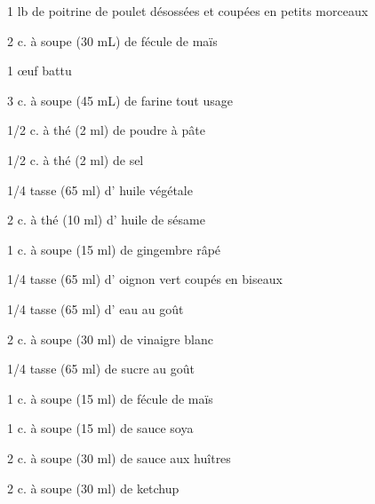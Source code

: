 


\totaltime{}


\begin{ingredients}
    \item 1 lb de poitrine de poulet désossées et coupées en petits morceaux
    \item 2 c. à soupe (30 mL) de fécule de maïs
    \item 1 œuf battu
    \item 3 c. à soupe (45 mL) de farine tout usage
    \item 1/2 c. à thé (2 ml) de poudre à pâte
    \item 1/2 c. à thé (2 ml) de sel
    \item 1/4 tasse (65 ml) d' huile végétale
    \item 2 c. à thé (10 ml) d' huile de sésame
    \item 1 c. à soupe (15 ml) de gingembre râpé
    \item 1/4 tasse (65 ml) d' oignon vert coupés en biseaux
    \item 1/4 tasse (65 ml) d' eau au goût
    \item 2 c. à soupe (30 ml) de vinaigre blanc
    \item 1/4 tasse (65 ml) de sucre au goût
    \item 1 c. à soupe (15 ml) de fécule de maïs
    \item 1 c. à soupe (15 ml) de sauce soya
    \item 2 c. à soupe (30 ml) de sauce aux huîtres
    \item 2 c. à soupe (30 ml) de ketchup
\end{ingredients}

